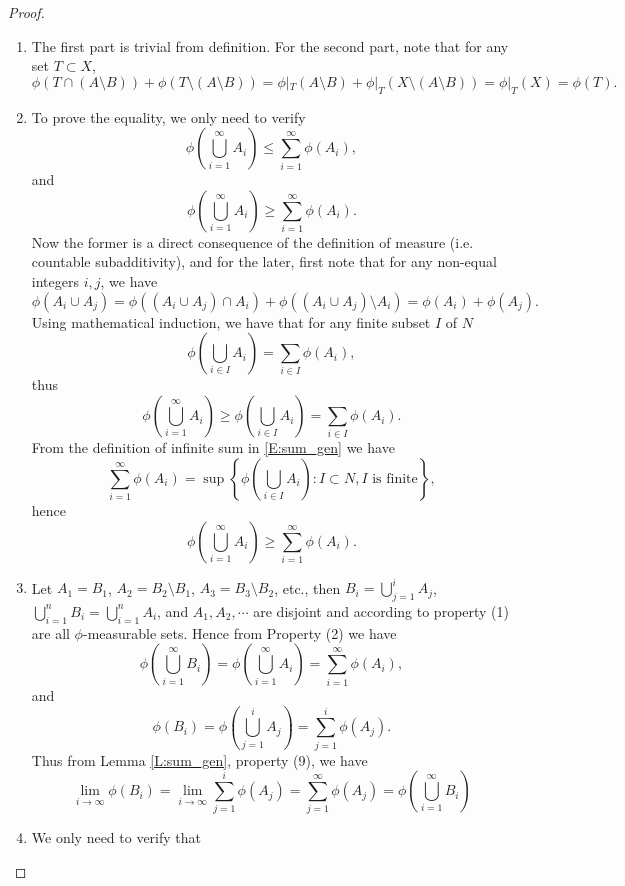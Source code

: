 \begin{proof}
\begin{enumerate}
\item The first part is trivial from definition. For the second part, note that
  for any set $T\subset X$,
  \[
    \phi(T\cap(A\setminus B)) + \phi(T\setminus (A\setminus B))
      = \phi|_T(A\setminus B) + \phi|_T(X\setminus (A\setminus B))
      = \phi|_T(X) = \phi(T).
  \]
\item To prove the equality, we only need to verify 
  \[
    \phi\left( \bigcup_{i=1}^{\infty} A_i \right) 
      \le \sum_{i=1}^{\infty} \phi(A_i),
  \]
  and 
  \[
    \phi\left( \bigcup_{i=1}^{\infty} A_i \right) 
      \ge \sum_{i=1}^{\infty} \phi(A_i).
  \]
  Now the former is a direct consequence of the definition of measure (i.e.
  countable subadditivity), and for the later, first note that for any 
  non-equal integers $i,j$, we have
  \[
    \phi(A_i\cup A_j)= \phi((A_i\cup A_j)\cap A_i) 
                      + \phi((A_i\cup A_j)\setminus A_i) 
                     = \phi(A_i) + \phi(A_j).
  \]
  Using mathematical induction, we have that for any finite subset $I$ of $N$
  \[
    \phi\left( \bigcup_{i\in I} A_i \right) = \sum_{i\in I} \phi(A_i),
  \]
  thus
  \[
    \phi\left( \bigcup_{i=1}^{\infty} A_i \right) 
      \ge \phi\left( \bigcup_{i\in I} A_i \right)= \sum_{i\in I} \phi(A_i).
  \]
  From the definition of infinite sum in \ref{E:sum_gen} we have
  \[
    \sum_{i=1}^{\infty} \phi(A_i)
      =\sup 
       \left\{  
         \phi\left( \bigcup_{i\in I} A_i \right)
           : I\subset N, \text{$I$ is finite}
       \right\},
  \]
  hence
  \[
    \phi\left( \bigcup_{i=1}^{\infty} A_i \right) 
      \ge \sum_{i=1}^{\infty} \phi(A_i).
  \]
\item Let $A_1=B_1$, $A_2=B_2\setminus B_1$, $A_3=B_3\setminus B_2$, etc., then
  $B_i=\bigcup_{j=1}^i A_j$, $\bigcup_{i=1}^n B_i=\bigcup_{i=1}^n A_i$, and 
  $A_1,A_2,\cdots$ are disjoint and according to property (1) are all
  $\phi$-measurable sets. Hence from Property (2) we have
  \[
    \phi\left(\bigcup_{i=1}^{\infty} B_i \right)
    = \phi\left(\bigcup_{i=1}^{\infty} A_i \right)
    = \sum_{i=1}^{\infty} \phi(A_i),
  \]
  and 
  \[
    \phi(B_i)=\phi\left(\bigcup_{j=1}^i A_j\right)
             = \sum_{j=1}^{i} \phi(A_j).
  \]
  Thus from Lemma \ref{L:sum_gen}, property (9), we have
  \[
    \lim_{i\to\infty}\phi(B_i)
    = \lim_{i\to\infty} \sum_{j=1}^{i} \phi(A_j)
    = \sum_{j=1}^{\infty} \phi(A_j)
    = \phi\left(\bigcup_{i=1}^{\infty} B_i \right)
  \]
\item We only need to verify that

\end{enumerate}
\end{proof}

